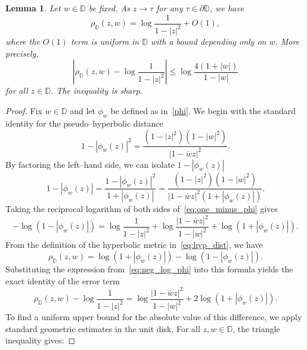 \documentclass[12pt]{amsart}
\numberwithin{equation}{section}
\theoremstyle{plain}
\newtheorem{lemma}[equation]{Lemma}
\theoremstyle{definition}
\begin{document}
\begin{lemma} \label{lem:boundary_asymp}
Let $w\in\mathbb{D}$ be fixed. As $z\to\tau$ for any $\tau\in\partial\mathbb{D}$, we have
\begin{equation} \label{eq:boundary_asymp}
\rho_{\mathbb{D}}(z,w) =\log\frac{1}{1-|z|^2}+O(1),
\end{equation}
where the $O(1)$ term is uniform in $\mathbb{D}$ with a bound depending only on $w$. More precisely,
\begin{equation} \label{eq:boundary_asymp_precise}
\left|\rho_{\mathbb{D}}(z,w) -\log\frac{1}{1-|z|^2}\right| \le\log\frac{4(1+|w|)}{1-|w|}
\end{equation}
for all $z\in\mathbb{D}$. The inequality is sharp.
\end{lemma}

\begin{proof}
Fix $w\in\mathbb{D}$ and let $\phi_w$ be defined as in~\eqref{phi}.
We begin with the standard identity for the pseudo--hyperbolic distance
\begin{equation}\label{identity-1-phiwz}
1-|\phi_w(z)|^2 = \frac{(1-|z|^2)(1-|w|^2)}{|1-\bar w z|^2}.
\end{equation}
By factoring the left--hand side, we can isolate $1-|\phi_w(z)|$
\begin{equation}\label{eq:one_minus_phi}
1-|\phi_w(z)| = \frac{1-|\phi_w(z)|^2}{1+|\phi_w(z)|} = \frac{(1-|z|^2)(1-|w|^2)}{|1-\bar w z|^2 (1+|\phi_w(z)|)}.
\end{equation}
Taking the reciprocal logarithm of both sides of~\eqref{eq:one_minus_phi} gives
\begin{equation}\label{eq:neg_log_phi}
-\log(1-|\phi_w(z)|) = \log\frac{1}{1-|z|^2} + \log\frac{|1-\bar w z|^2}{1-|w|^2} + \log(1+|\phi_w(z)|).
\end{equation}
From the definition of the hyperbolic metric in~\eqref{eq:hyp_dist}, we have
\begin{equation*}
\rho_{\mathbb{D}}(z,w) =  \log(1+|\phi_w(z)|)-\log(1-|\phi_w(z)|).
\end{equation*}
Substituting the expression from~\eqref{eq:neg_log_phi} into this formula yields the exact identity of the error term
\begin{equation}\label{eq:exact_error}
\rho_{\mathbb{D}}(z,w) - \log\frac{1}{1-|z|^2} = \log\frac{|1-\bar w z|^2}{1-|w|^2} + 2\log(1+|\phi_w(z)|).
\end{equation}
To find a uniform upper bound for the absolute value of this difference, we apply standard geometric estimates in the unit disk. For all $z, w \in \mathbb{D}$, the triangle inequality gives:

\end{proof}
\end{document}
